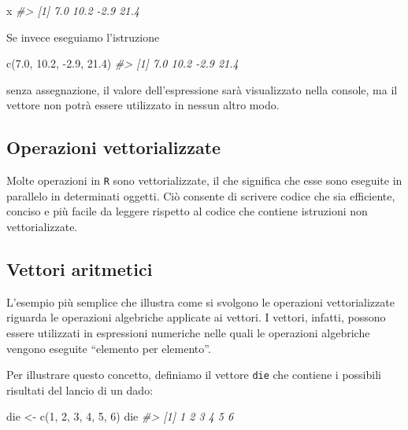 \documentclass[
]{memoir}
\newenvironment{Shaded}{\begin{snugshade}}{\end{snugshade}}
\newcommand{\CommentTok}[1]{\textcolor[rgb]{0.56,0.35,0.01}{\textit{#1}}}
\newcommand{\DecValTok}[1]{\textcolor[rgb]{0.00,0.00,0.81}{#1}}
\newcommand{\FloatTok}[1]{\textcolor[rgb]{0.00,0.00,0.81}{#1}}
\newcommand{\FunctionTok}[1]{\textcolor[rgb]{0.00,0.00,0.00}{#1}}
\newcommand{\NormalTok}[1]{#1}
\newcommand{\OtherTok}[1]{\textcolor[rgb]{0.56,0.35,0.01}{#1}}
\newcommand{\SpecialCharTok}[1]{\textcolor[rgb]{0.00,0.00,0.00}{#1}}
\theoremstyle{definition}
\theoremstyle{definition}
\theoremstyle{definition}
\theoremstyle{definition}
\theoremstyle{remark}
\begin{document}
\begin{Shaded}
\begin{Highlighting}[]
\NormalTok{x}
\CommentTok{\#\textgreater{} [1]  7.0 10.2 {-}2.9 21.4}
\end{Highlighting}
\end{Shaded}

Se invece eseguiamo l'istruzione

\begin{Shaded}
\begin{Highlighting}[]
\FunctionTok{c}\NormalTok{(}\FloatTok{7.0}\NormalTok{, }\FloatTok{10.2}\NormalTok{, }\SpecialCharTok{{-}}\FloatTok{2.9}\NormalTok{, }\FloatTok{21.4}\NormalTok{)}
\CommentTok{\#\textgreater{} [1]  7.0 10.2 {-}2.9 21.4}
\end{Highlighting}
\end{Shaded}

senza assegnazione, il valore dell'espressione sarà visualizzato nella
console, ma il vettore non potrà essere utilizzato in nessun altro modo.

\hypertarget{operazioni-vettorializzate}{%
\subsection{Operazioni vettorializzate}\label{operazioni-vettorializzate}}

Molte operazioni in \texttt{R} sono vettorializzate, il che significa che esse
sono eseguite in parallelo in determinati oggetti. Ciò consente di
scrivere codice che sia efficiente, conciso e più facile da leggere
rispetto al codice che contiene istruzioni non vettorializzate.

\hypertarget{vettori-aritmetici}{%
\subsection{Vettori aritmetici}\label{vettori-aritmetici}}

L'esempio più semplice che illustra come si svolgono le operazioni
vettorializzate riguarda le operazioni algebriche applicate ai vettori.
I vettori, infatti, possono essere utilizzati in espressioni numeriche
nelle quali le operazioni algebriche vengono eseguite ``elemento per
elemento''.

Per illustrare questo concetto, definiamo il vettore \texttt{die} che contiene
i possibili risultati del lancio di un dado:

\begin{Shaded}
\begin{Highlighting}[]
\NormalTok{die }\OtherTok{\textless{}{-}} \FunctionTok{c}\NormalTok{(}\DecValTok{1}\NormalTok{, }\DecValTok{2}\NormalTok{, }\DecValTok{3}\NormalTok{, }\DecValTok{4}\NormalTok{, }\DecValTok{5}\NormalTok{, }\DecValTok{6}\NormalTok{)}
\NormalTok{die}
\CommentTok{\#\textgreater{} [1] 1 2 3 4 5 6}
\end{Highlighting}
\end{Shaded}
\end{document}
